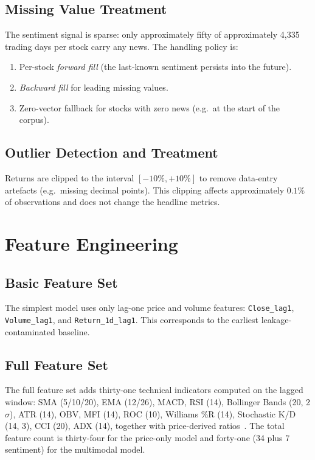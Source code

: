 \documentclass[12pt,a4paper,oneside]{report}
\newcommand{\code}[1]{\texttt{#1}}
\begin{document}
\subsection{Missing Value Treatment}

The sentiment signal is sparse: only approximately fifty of
approximately 4{,}335 trading days per stock carry any news. The
handling policy is:

\begin{enumerate}[leftmargin=*,itemsep=2pt]
  \item Per-stock \emph{forward fill} (the last-known sentiment
        persists into the future).
  \item \emph{Backward fill} for leading missing values.
  \item Zero-vector fallback for stocks with zero news (e.g.\ at
        the start of the corpus).
\end{enumerate}

\subsection{Outlier Detection and Treatment}

Returns are clipped to the interval $[-10\%, +10\%]$ to remove
data-entry artefacts (e.g.\ missing decimal points). This clipping
affects approximately $0.1\%$ of observations and does not change
the headline metrics.

\section{Feature Engineering}

\subsection{Basic Feature Set}

The simplest model uses only lag-one price and volume features:
\code{Close\_lag1}, \code{Volume\_lag1}, and \code{Return\_1d\_lag1}.
This corresponds to the earliest leakage-contaminated baseline.

\subsection{Full Feature Set}

The full feature set adds thirty-one technical indicators computed
on the lagged window: \ac{SMA} (5/10/20), \ac{EMA} (12/26),
\ac{MACD}, \ac{RSI} (14), Bollinger Bands (20, 2$\sigma$),
\ac{ATR} (14), \ac{OBV}, MFI (14), ROC (10), Williams \%R (14),
Stochastic K/D (14, 3), CCI (20), ADX (14), together with
price-derived ratios~\cite{tsay2010analysis}. The total feature
count is thirty-four for the price-only model and forty-one
(34 plus 7 sentiment) for the multimodal model.
\end{document}
